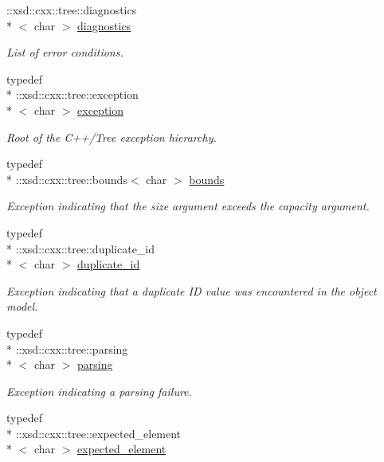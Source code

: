 \begin{DoxyCompactItemize}
\-::xsd\-::cxx\-::tree\-::diagnostics\\*
$<$ char $>$ \hyperlink{namespacexml__schema_a0d9a5a38c30964872464e338625301d8}{diagnostics}
\begin{DoxyCompactList}\small\item\em List of error conditions. \end{DoxyCompactList}\item 
typedef \\*
\-::xsd\-::cxx\-::tree\-::exception\\*
$<$ char $>$ \hyperlink{namespacexml__schema_a1e9265f27587f794fe1b02f5cefb447f}{exception}
\begin{DoxyCompactList}\small\item\em Root of the C++/\-Tree exception hierarchy. \end{DoxyCompactList}\item 
typedef \\*
\-::xsd\-::cxx\-::tree\-::bounds$<$ char $>$ \hyperlink{namespacexml__schema_a0130942a2c58fd1fda434722d42ede1d}{bounds}
\begin{DoxyCompactList}\small\item\em Exception indicating that the size argument exceeds the capacity argument. \end{DoxyCompactList}\item 
typedef \\*
\-::xsd\-::cxx\-::tree\-::duplicate\-\_\-id\\*
$<$ char $>$ \hyperlink{namespacexml__schema_a6dc417261c18af4fcce090133dd605f8}{duplicate\-\_\-id}
\begin{DoxyCompactList}\small\item\em Exception indicating that a duplicate I\-D value was encountered in the object model. \end{DoxyCompactList}\item 
typedef \\*
\-::xsd\-::cxx\-::tree\-::parsing\\*
$<$ char $>$ \hyperlink{namespacexml__schema_afbb8ed049be1751901785a29a6d13942}{parsing}
\begin{DoxyCompactList}\small\item\em Exception indicating a parsing failure. \end{DoxyCompactList}\item 
typedef \\*
\-::xsd\-::cxx\-::tree\-::expected\-\_\-element\\*
$<$ char $>$ \hyperlink{namespacexml__schema_a8deca57d1e322d97eea32518a7237a49}{expected\-\_\-element}

\end{DoxyCompactItemize}
